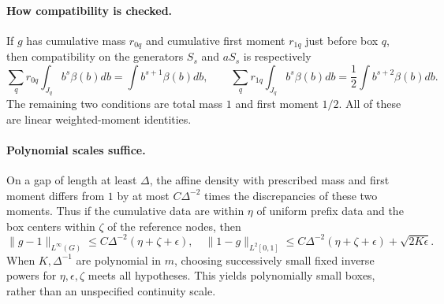 \documentclass[11pt]{article}
\begin{document}
\paragraph{How compatibility is checked.}
If $g$ has cumulative mass $r_{0q}$ and cumulative first moment
$r_{1q}$ just before box $q$, then compatibility on the generators
$S_s$ and $aS_s$ is respectively
\[
 \sum_q r_{0q}\int_{J_q}b^s\beta(b)db=\int b^{s+1}\beta(b)db,
 \qquad
 \sum_q r_{1q}\int_{J_q}b^s\beta(b)db=\frac12\int b^{s+2}\beta(b)db.
\]
The remaining two conditions are total mass $1$ and first moment
$1/2$. All of these are linear weighted-moment identities.

\paragraph{Polynomial scales suffice.}
On a gap of length at least $\Delta$, the affine density with prescribed
mass and first moment differs from $1$ by at most $C\Delta^{-2}$ times
the discrepancies of these two moments. Thus if the cumulative data
are within $\eta$ of uniform prefix data and the box centers within
$\zeta$ of the reference nodes, then
\[
 \|g-1\|_{L^\infty(G)}\le C\Delta^{-2}(\eta+\zeta+\epsilon),\quad
 \|1-g\|_{L^2[0,1]}\le
 C\Delta^{-2}(\eta+\zeta+\epsilon)+\sqrt{2K\epsilon}.
\]
When $K,\Delta^{-1}$ are polynomial in $m$, choosing successively small
fixed inverse powers for $\eta,\epsilon,\zeta$ meets all hypotheses.
This yields polynomially small boxes, rather than an unspecified
continuity scale.
\end{document}

